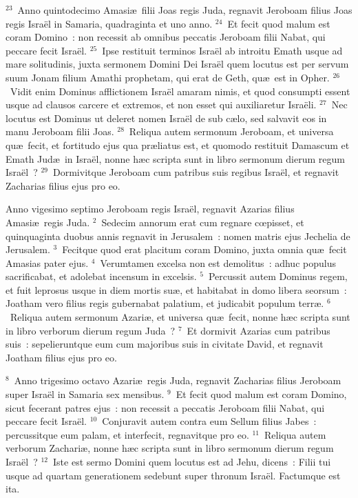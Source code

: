 ${}^{23}$~Anno quintodecimo Amasi\ae\ filii Joas regis Juda, regnavit Jeroboam filius Joas regis Isra\"el in Samaria, quadraginta et uno anno.
${}^{24}$~Et fecit quod malum est coram Domino~: non recessit ab omnibus peccatis Jeroboam filii Nabat, qui peccare fecit Isra\"el.
${}^{25}$~Ipse restituit terminos Isra\"el ab introitu Emath usque ad mare solitudinis, juxta sermonem Domini Dei Isra\"el quem locutus est per servum suum Jonam filium Amathi prophetam, qui erat de Geth, qu\ae\ est in Opher.
${}^{26}$~Vidit enim Dominus afflictionem Isra\"el amaram nimis, et quod consumpti essent usque ad clausos carcere et extremos, et non esset qui auxiliaretur Isra\"eli.
${}^{27}$~Nec locutus est Dominus ut deleret nomen Isra\"el de sub c\ae lo, sed salvavit eos in manu Jeroboam filii Joas.
${}^{28}$~Reliqua autem sermonum Jeroboam, et universa qu\ae\ fecit, et fortitudo ejus qua pr\ae liatus est, et quomodo restituit Damascum et Emath Jud\ae\ in Isra\"el, nonne h\ae c scripta sunt in libro sermonum dierum regum Isra\"el~?
${}^{29}$~Dormivitque Jeroboam cum patribus suis regibus Isra\"el, et regnavit Zacharias filius ejus pro eo.

\lettrine[lines=10,image=true,loversize=0.05,lraise=-0.03]{A}{}nno vigesimo septimo Jeroboam regis Isra\"el, regnavit Azarias filius Amasi\ae\ regis Juda.
${}^{2}$~Sedecim annorum erat cum regnare cœpisset, et quinquaginta duobus annis regnavit in Jerusalem~: nomen matris ejus Jechelia de Jerusalem.
${}^{3}$~Fecitque quod erat placitum coram Domino, juxta omnia qu\ae\ fecit Amasias pater ejus.
${}^{4}$~Verumtamen excelsa non est demolitus~: adhuc populus sacrificabat, et adolebat incensum in excelsis.
${}^{5}$~Percussit autem Dominus regem, et fuit leprosus usque in diem mortis su\ae , et habitabat in domo libera seorsum~: Joatham vero filius regis gubernabat palatium, et judicabit populum terr\ae .
${}^{6}$~Reliqua autem sermonum Azari\ae , et universa qu\ae\ fecit, nonne h\ae c scripta sunt in libro verborum dierum regum Juda~?
${}^{7}$~Et dormivit Azarias cum patribus suis~: sepelieruntque eum cum majoribus suis in civitate David, et regnavit Joatham filius ejus pro eo.


${}^{8}$~Anno trigesimo octavo Azari\ae\ regis Juda, regnavit Zacharias filius Jeroboam super Isra\"el in Samaria sex mensibus.
${}^{9}$~Et fecit quod malum est coram Domino, sicut fecerant patres ejus~: non recessit a peccatis Jeroboam filii Nabat, qui peccare fecit Isra\"el.
${}^{10}$~Conjuravit autem contra eum Sellum filius Jabes~: percussitque eum palam, et interfecit, regnavitque pro eo.
${}^{11}$~Reliqua autem verborum Zachari\ae , nonne h\ae c scripta sunt in libro sermonum dierum regum Isra\"el~?
${}^{12}$~Iste est sermo Domini quem locutus est ad Jehu, dicens~: Filii tui usque ad quartam generationem sedebunt super thronum Isra\"el. Factumque est ita.


